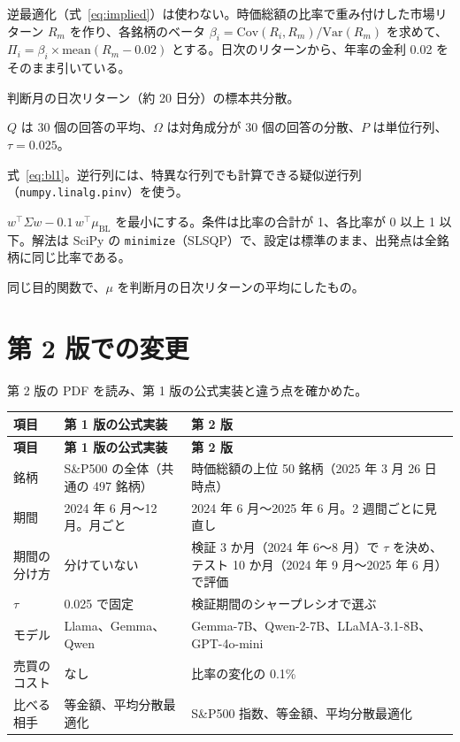 \documentclass[xelatex,ja=standard,jafont=hiragino-pron,a4paper,10pt]{bxjsreport}
\newcommand{\SP}{S\&P500}
\newcommand{\code}[1]{\texttt{#1}}
\begin{document}
\begin{description}[leftmargin=2em,style=nextline,itemsep=0.4em]
\item[事前の期待リターン] 逆最適化（式~\eqref{eq:implied}）は使わない。時価総額の比率で重み付けした市場リターン $R_m$ を作り、各銘柄のベータ $\beta_i = \mathrm{Cov}(R_i, R_m)/\mathrm{Var}(R_m)$ を求めて、$\Pi_i = \beta_i \times \mathrm{mean}(R_m - 0.02)$ とする。日次のリターンから、年率の金利 0.02 をそのまま引いている。
\item[共分散] 判断月の日次リターン（約 20 日分）の標本共分散。
\item[ビュー] $Q$ は 30 個の回答の平均、$\Omega$ は対角成分が 30 個の回答の分散、$P$ は単位行列、$\tau = 0.025$。
\item[事後の期待リターン] 式~\eqref{eq:bl1}。逆行列には、特異な行列でも計算できる疑似逆行列（\code{numpy.linalg.pinv}）を使う。
\item[最適化] $w^\top\Sigma w - 0.1\, w^\top\mu_{\mathrm{BL}}$ を最小にする。条件は比率の合計が 1、各比率が 0 以上 1 以下。解法は SciPy の \code{minimize}（SLSQP）で、設定は標準のまま、出発点は全銘柄に同じ比率である。
\item[比べる相手の平均分散最適化] 同じ目的関数で、$\mu$ を判断月の日次リターンの平均にしたもの。
\end{description}

\section{第 2 版での変更}\label{sec:v2}

第 2 版の PDF を読み、第 1 版の公式実装と違う点を確かめた。

\begin{longtable}{p{3.20cm}p{5.40cm}p{5.80cm}}
\toprule
\textbf{項目} & \textbf{第 1 版の公式実装} & \textbf{第 2 版} \\
\midrule
\endfirsthead
\toprule
\textbf{項目} & \textbf{第 1 版の公式実装} & \textbf{第 2 版} \\
\midrule
\endhead
\bottomrule
\endfoot
銘柄 & \SP{} の全体（共通の 497 銘柄） & 時価総額の上位 50 銘柄（2025 年 3 月 26 日時点） \\
期間 & 2024 年 6 月〜12 月。月ごと & 2024 年 6 月〜2025 年 6 月。2 週間ごとに見直し \\
期間の分け方 & 分けていない & 検証 3 か月（2024 年 6〜8 月）で $\tau$ を決め、テスト 10 か月（2024 年 9 月〜2025 年 6 月）で評価 \\
$\tau$ & 0.025 で固定 & 検証期間のシャープレシオで選ぶ \\
モデル & Llama、Gemma、Qwen & Gemma-7B、Qwen-2-7B、LLaMA-3.1-8B、GPT-4o-mini \\
売買のコスト & なし & 比率の変化の 0.1\% \\
比べる相手 & 等金額、平均分散最適化 & \SP{} 指数、等金額、平均分散最適化 \\
\end{longtable}
\end{document}

